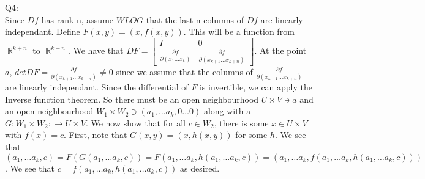 \documentclass[letterpaper]{article}
\DeclareMathOperator{\R}{\mathbb{R}}
\begin{document}
Q4:\\ Since $Df$ has rank n, assume $WLOG$ that the last n columns of $Df$ are linearly independant. Define $F(x,y)=(x,f(x,y))$. This will be a function from $\R^{k+n}$ to $\R^{k+n}$. We have that $DF = \begin{bmatrix}  I & 0 \\ \frac{\partial f}{\partial (x_1 \dots x_k)} & \frac{\partial f}{\partial (x_{k+1}\dots x_{k+n})}\end{bmatrix}$. 
At the point $a$, $det DF = \frac{\partial f}{\partial (x_{k+1}\dots x_{k+n})} \neq 0$ since we assume that the columns of $\frac{\partial f}{\partial (x_{k+1} \dots x_{k+n})}$ are linearly independant. Since the differential of $F$ is invertible, we can apply the Inverse function theorem. So there must be an open neighbourhood $U \times V \ni a$ and an open neighbourhood $W_1 \times W_2 \ni (a_1, \dots a_k, 0\dots 0)$ along with a $G: W_1 \times W_2: \rightarrow U \times V$. 
We now show that for all $c\in W_2$, there is some $x\in U \times V$ with $f(x)=c$. First, note that $G(x,y) = (x,h(x,y))$ for some $h$. We see that $$(a_1,\dots a_k,c) = F(G(a_1,\dots a_k,c)) = F(a_1,\dots a_k, h(a_1,\dots a_k,c)) = (a_1,\dots a_k, f(a_1,\dots a_k,h(a_1,\dots a_k,c)))$$. We see that $c= f(a_1,\dots a_k,h(a_1,\dots a_k,c))$ as desired. 
\end{document}
